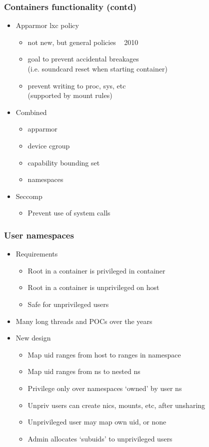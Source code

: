 \documentclass{beamer}
\begin{document}
\begin{frame}
\frametitle{Containers functionality (contd)}
\begin{itemize}
\item Apparmor lxc policy
  \begin{itemize}
  \item not new, but general policies ~ 2010
  \item  goal to prevent accidental breakages \\
  (i.e. soundcard reset when starting container)
  \item prevent writing to proc, sys, etc \\
  (supported by mount rules)
  \end{itemize}
\pause
\item Combined
  \begin{itemize}
  \item apparmor
  \item device cgroup
  \item capability bounding set
  \item namespaces
  \end{itemize}

\pause
\item Seccomp
  \begin{itemize}
  \item Prevent use of system calls
  \end{itemize}
\end{itemize}

\end{frame}

\begin{frame}
\frametitle{User namespaces}
  \begin{itemize}
  \item Requirements
    \begin{itemize}
      \item Root in a container is privileged in container
      \item Root in a container is unprivileged on host
      \item Safe for unprivileged users
    \end{itemize}
  \item Many long threads and POCs over the years
  \pause
  \item New design
    \begin{itemize}
    \item Map uid ranges from host to ranges in namespace
    \item Map uid ranges from ns to nested ns
    \item Privilege only over namespaces `owned' by user ns
    \item Unpriv users can create nics, mounts, etc, after unsharing
    \item Unprivileged user may map own uid, or none
    \item Admin allocates `subuids' to unprivileged users
    \end{itemize}
  \end{itemize}
\end{frame}
\end{document}
